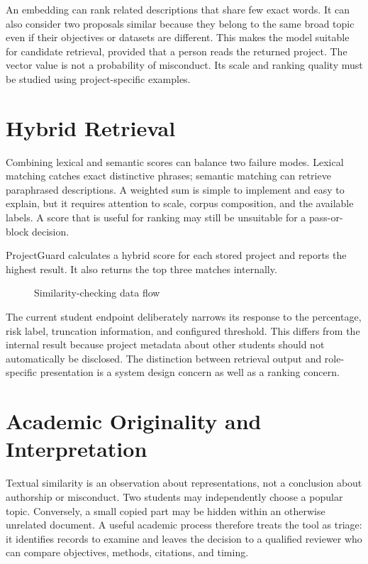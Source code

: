 \documentclass[12pt,a4paper]{report}
\begin{document}
An embedding can rank related descriptions that share few exact words. It can also consider two proposals similar because they belong to the same broad topic even if their objectives or datasets are different. This makes the model suitable for candidate retrieval, provided that a person reads the returned project. The vector value is not a probability of misconduct. Its scale and ranking quality must be studied using project-specific examples.

\section{Hybrid Retrieval}
Combining lexical and semantic scores can balance two failure modes. Lexical matching catches exact distinctive phrases; semantic matching can retrieve paraphrased descriptions. A weighted sum is simple to implement and easy to explain, but it requires attention to scale, corpus composition, and the available labels. A score that is useful for ranking may still be unsuitable for a pass-or-block decision.

ProjectGuard calculates a hybrid score for each stored project and reports the highest result. It also returns the top three matches internally. \begin{figure}[htbp]\centering
{}
\caption{Similarity-checking data flow}\label{fig:checkflow}
\end{figure}
The current student endpoint deliberately narrows its response to the percentage, risk label, truncation information, and configured threshold. This differs from the internal result because project metadata about other students should not automatically be disclosed. The distinction between retrieval output and role-specific presentation is a system design concern as well as a ranking concern.


\section{Academic Originality and Interpretation}
Textual similarity is an observation about representations, not a conclusion about authorship or misconduct. Two students may independently choose a popular topic. Conversely, a small copied part may be hidden within an otherwise unrelated document. A useful academic process therefore treats the tool as triage: it identifies records to examine and leaves the decision to a qualified reviewer who can compare objectives, methods, citations, and timing.
\end{document}

